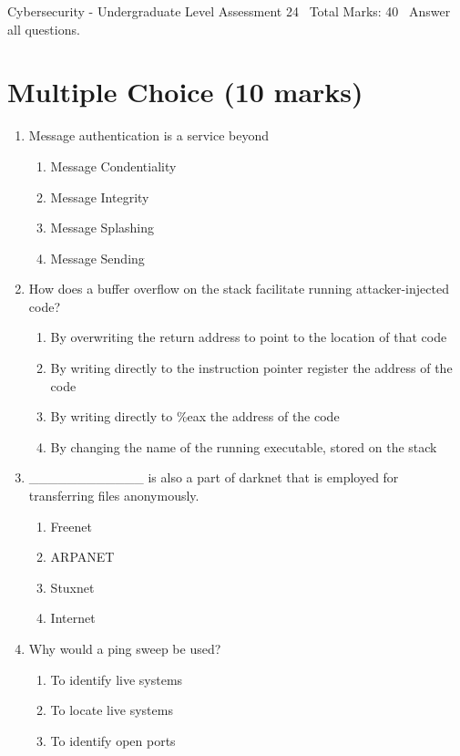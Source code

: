 \documentclass[12pt]{article}
\begin{document}
\begin{center}
Cybersecurity - Undergraduate Level Assessment 24 \
Total Marks: 40 \
Answer all questions.
\end{center}

\section*{Multiple Choice (10 marks)}
\begin{enumerate}[label=\arabic*.]
\item Message authentication is a service beyond
\begin{enumerate}[label=(\alph*)]
    \item Message Condentiality
    \item Message Integrity
    \item Message Splashing
    \item Message Sending
\end{enumerate}
\item How does a buffer overflow on the stack facilitate running attacker-injected code?
\begin{enumerate}[label=(\alph*)]
    \item By overwriting the return address to point to the location of that code
    \item By writing directly to the instruction pointer register the address of the code
    \item By writing directly to \%eax the address of the code
    \item By changing the name of the running executable, stored on the stack
\end{enumerate}
\item \_\_\_\_\_\_\_\_\_\_\_\_ is also a part of darknet that is employed for transferring files anonymously.
\begin{enumerate}[label=(\alph*)]
    \item Freenet
    \item ARPANET
    \item Stuxnet
    \item Internet
\end{enumerate}
\item Why would a ping sweep be used?
\begin{enumerate}[label=(\alph*)]
    \item To identify live systems
    \item To locate live systems
    \item To identify open ports

\end{enumerate}
\end{enumerate}
\end{document}
